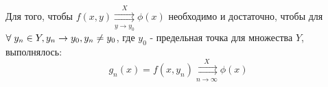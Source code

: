 \begin{col-answer-preambule}
\end{col-answer-preambule}

\begin{theorem}
	Для того, чтобы $f(x,y) \underset{y \to y_0}{\overset{X}{\rightrightarrows}} \phi(x)$ необходимо и достаточно, чтобы для $\forall \; y_n \in Y, \linebreak y_n \to y_0, y_n \ne y_0$, где $y_0$ - предельная точка для множества $Y$, выполнялось:
	\begin{equation}
	\label{eq:lecture04-090}
	g_n(x) = f(x, y_n) \underset{n \to \infty}{\overset{X}{\rightrightarrows}} \phi(x)
	\end{equation}
\end{theorem}
